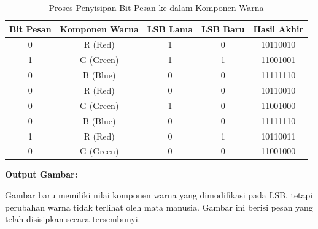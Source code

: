 \documentclass{ittelkom}
\begin{document}
\begin{enumerate}
\begin{enumerate}
                    \begin{table}[H]
                        \centering
                        \begin{tabular}{|c|c|c|c|c|}
                            \hline
                            \textbf{Bit Pesan} & \textbf{Komponen Warna} & \textbf{LSB Lama} & \textbf{LSB Baru} & \textbf{Hasil Akhir} \\ \hline
                            0                  & R (Red)                 & 1                 & 0                 & 10110010             \\ \hline
                            1                  & G (Green)               & 1                 & 1                 & 11001001             \\ \hline
                            0                  & B (Blue)                & 0                 & 0                 & 11111110             \\ \hline
                            0                  & R (Red)                 & 0                 & 0                 & 10110010             \\ \hline
                            0                  & G (Green)               & 1                 & 0                 & 11001000             \\ \hline
                            0                  & B (Blue)                & 0                 & 0                 & 11111110             \\ \hline
                            1                  & R (Red)                 & 0                 & 1                 & 10110011             \\ \hline
                            0                  & G (Green)               & 0                 & 0                 & 11001000             \\ \hline
                        \end{tabular}
                        \caption{Proses Penyisipan Bit Pesan ke dalam Komponen Warna}
                    \end{table}

                    \textbf{Output Gambar:}

                    Gambar baru memiliki nilai komponen warna yang dimodifikasi pada LSB, tetapi
                    perubahan warna tidak terlihat oleh mata manusia. Gambar ini berisi pesan yang
                    telah disisipkan secara tersembunyi.

          \end{enumerate}


\end{enumerate}
\end{document}
